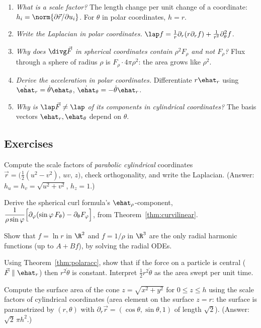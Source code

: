 \begin{interview}
\begin{enumerate}
  \item \emph{What is a scale factor?} The length change per unit change of a coordinate: $h_i=\norm{\partial\vec r/\partial u_i}$. For $\theta$ in polar coordinates, $h=r$.
  \item \emph{Write the Laplacian in polar coordinates.} $\lap f=\frac1r\partial_r(r\partial_rf)+\frac1{r^2}\partial_\theta^2f$.
  \item \emph{Why does $\divg\vec F$ in spherical coordinates contain $\rho^2F_\rho$ and not $F_\rho$?} Flux through a sphere of radius $\rho$ is $F_\rho\cdot4\pi\rho^2$: the area grows like $\rho^2$.
  \item \emph{Derive the acceleration in polar coordinates.} Differentiate $r\ehat_r$ using $\dot{\ehat}_r=\dot\theta\ehat_\theta$, $\dot{\ehat}_\theta=-\dot\theta\ehat_r$.
  \item \emph{Why is $\lap\vec F\ne\lap$ of its components in cylindrical coordinates?} The basis vectors $\ehat_r,\ehat_\theta$ depend on $\theta$.
\end{enumerate}
\end{interview}

\subsection*{Exercises}
\begin{exercise}
Compute the scale factors of \emph{parabolic cylindrical} coordinates $\vec r=\bigl(\tfrac12(u^2-v^2),\,uv,\,z\bigr)$, check orthogonality, and write the Laplacian. (Answer: $h_u=h_v=\sqrt{u^2+v^2}$, $h_z=1$.)
\end{exercise}
\begin{exercise}
Derive the spherical curl formula's $\ehat_\rho$-component, $\dfrac1{\rho\sin\varphi}\Bigl[\partial_\varphi(\sin\varphi\,F_\theta)-\partial_\theta F_\varphi\Bigr]$, from Theorem~\ref{thm:curvilinear}.
\end{exercise}
\begin{exercise}
Show that $f=\ln r$ in $\R^2$ and $f=1/\rho$ in $\R^3$ are the only radial harmonic functions (up to $A+B f$), by solving the radial ODEs.
\end{exercise}
\begin{exercise}
Using Theorem~\ref{thm:polaracc}, show that if the force on a particle is central ($\vec F\parallel\ehat_r$) then $r^2\dot\theta$ is constant. Interpret $\tfrac12r^2\dot\theta$ as the area swept per unit time.
\end{exercise}
\begin{exercise}
Compute the surface area of the cone $z=\sqrt{x^2+y^2}$ for $0\le z\le h$ using the scale factors of cylindrical coordinates (area element on the surface $z=r$: the surface is parametrized by $(r,\theta)$ with $\partial_r\vec r=(\cos\theta,\sin\theta,1)$ of length $\sqrt2$). (Answer: $\sqrt2\,\pi h^2$.)
\end{exercise}
